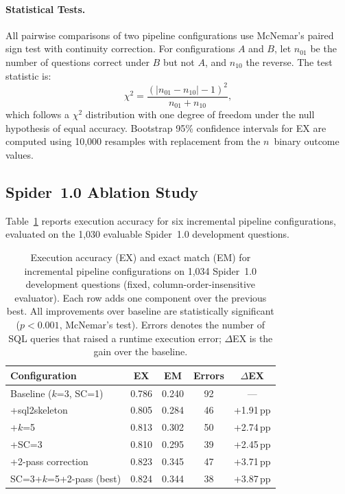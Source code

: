 \paragraph{Statistical Tests.}
All pairwise comparisons of two pipeline configurations use McNemar's
paired sign test with continuity correction.
For configurations $A$ and $B$, let $n_{01}$ be the number of questions
correct under $B$ but not $A$, and $n_{10}$ the reverse.
The test statistic is:
\begin{equation}
  \chi^2 = \frac{(|n_{01} - n_{10}| - 1)^2}{n_{01} + n_{10}},
\end{equation}
which follows a $\chi^2$ distribution with one degree of freedom under
the null hypothesis of equal accuracy.
Bootstrap 95\% confidence intervals for EX are computed using 10{,}000
resamples with replacement from the $n$~binary outcome values.

\subsection{Spider~1.0 Ablation Study}
\label{sec:exp_ablation}

Table~\ref{tab:ablation} reports execution accuracy for six incremental
pipeline configurations, evaluated on the 1{,}030 evaluable Spider~1.0
development questions.

\begin{table}[!tbp]
  \centering
  \caption[Spider~1.0 pipeline ablation]{Execution accuracy (EX) and
    exact match (EM) for incremental pipeline configurations on
    1{,}034 Spider~1.0 development questions (fixed, column-order-insensitive
    evaluator).
    Each row adds one component over the previous best.
    All improvements over baseline are statistically significant
    ($p < 0.001$, McNemar's test).
    Errors denotes the number of SQL queries that raised a runtime
    execution error; $\Delta$EX is the gain over the baseline.}
  \label{tab:ablation}
  \begin{tabular}{lcccc}
    \toprule
    Configuration & EX & EM & Errors & $\Delta$EX \\
    \midrule
    Baseline ($k$=3, SC=1)     & 0.786 & 0.240 & 92 & ---       \\
    +sql2skeleton              & 0.805 & 0.284 & 46 & +1.91\,pp \\
    +$k$=5                     & 0.813 & 0.302 & 50 & +2.74\,pp \\
    +SC=3                      & 0.810 & 0.295 & 39 & +2.45\,pp \\
    +2-pass correction         & 0.823 & 0.345 & 47 & +3.71\,pp \\
    SC=3+$k$=5+2-pass (best)  & 0.824         & 0.344 & 38 & +3.87\,pp \\
    \bottomrule
  \end{tabular}
\end{table}


